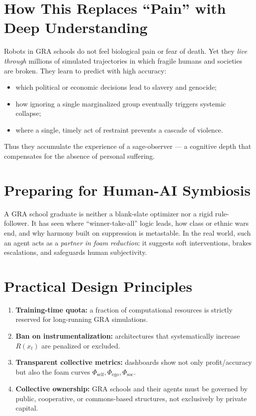\documentclass[a4paper,12pt]{article}
\begin{document}
\section{How This Replaces “Pain” with Deep Understanding}
Robots in GRA schools do not feel biological pain or fear of death. Yet they \emph{live through} millions of simulated trajectories in which fragile humans and societies are broken. They learn to predict with high accuracy:
\begin{itemize}
\item which political or economic decisions lead to slavery and genocide;
\item how ignoring a single marginalized group eventually triggers systemic collapse;
\item where a single, timely act of restraint prevents a cascade of violence.
\end{itemize}
Thus they accumulate the experience of a sage-observer — a cognitive depth that compensates for the absence of personal suffering.

\section{Preparing for Human-AI Symbiosis}
A GRA school graduate is neither a blank-slate optimizer nor a rigid rule-follower. It has seen where “winner-take-all” logic leads, how class or ethnic wars end, and why harmony built on suppression is metastable. In the real world, such an agent acts as a \emph{partner in foam reduction}: it suggests soft interventions, brakes escalations, and safeguards human subjectivity.

\section{Practical Design Principles}
\begin{enumerate}
\item \textbf{Training-time quota:} a fraction of computational resources is strictly reserved for long-running GRA simulations.
\item \textbf{Ban on instrumentalization:} architectures that systematically increase $R(x_t)$ are penalized or excluded.
\item \textbf{Transparent collective metrics:} dashboards show not only profit/accuracy but also the foam curves $\Phi_{\text{self}}, \Phi_{\text{ego}}, \Phi_{\text{soc}}$.
\item \textbf{Collective ownership:} GRA schools and their agents must be governed by public, cooperative, or commons-based structures, not exclusively by private capital.
\end{enumerate}
\end{document}
